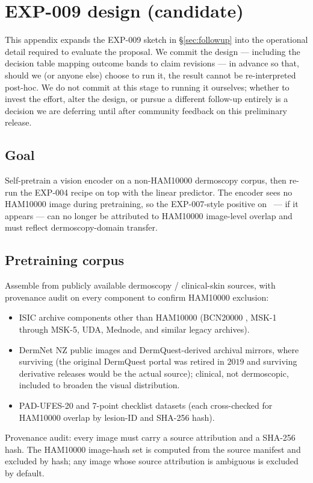 \section{EXP-009 design (candidate)}
\label{app:exp009-design}

This appendix expands the EXP-009 sketch in \S\ref{sec:followup} into
the operational detail required to evaluate the proposal. We commit
the design --- including the decision table mapping outcome bands to
claim revisions --- in advance so that, should we (or anyone else)
choose to run it, the result cannot be re-interpreted post-hoc. We do
not commit at this stage to running it ourselves; whether to invest the
effort, alter the design, or pursue a different follow-up entirely is a
decision we are deferring until after community feedback on this
preliminary release.

\subsection{Goal}
Self-pretrain a vision encoder on a non-HAM10000 dermoscopy corpus, then
re-run the EXP-004 recipe on top with the linear predictor. The encoder
sees no HAM10000 image during pretraining, so the EXP-007-style positive
on \strongholdtwo\ --- if it appears --- can no longer be attributed to
HAM10000 image-level overlap and must reflect dermoscopy-domain transfer.

\subsection{Pretraining corpus}
Assemble from publicly available dermoscopy / clinical-skin sources, with
provenance audit on every component to confirm HAM10000 exclusion:
\begin{itemize}
\item ISIC archive components other than HAM10000 (BCN20000
      \citep{combalia2019bcn20000}, MSK-1 through MSK-5, UDA, Mednode,
      and similar legacy archives).
\item DermNet NZ public images and DermQuest-derived archival mirrors,
      where surviving (the original DermQuest portal was retired in
      $2019$ and surviving derivative releases would be the actual
      source); clinical, not dermoscopic, included to broaden the
      visual distribution.
\item PAD-UFES-20 and 7-point checklist datasets (each cross-checked
      for HAM10000 overlap by lesion-ID and SHA-256 hash).
\end{itemize}
Provenance audit: every image must carry a source attribution and a
SHA-256 hash. The HAM10000 image-hash set is computed from the source
manifest and excluded by hash; any image whose source attribution is
ambiguous is excluded by default.

